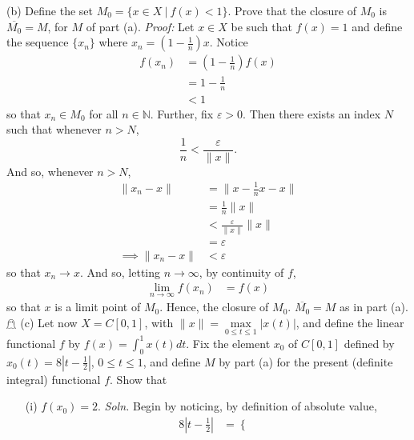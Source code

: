 \documentclass{article}
\begin{document}
\begin{itemize}
    (b) Define the set $M_0 = \{x \in X \: | \: f(x) < 1\}$. Prove that the closure of $M_0$ is $\overline{M_0} = M$, for $M$ of part (a).
    \newline\newline
    \textit{Proof:} Let $x \in X$ be such that $f(x) = 1$ and define the sequence $\{x_n\}$ where $x_n = (1 - \tfrac{1}{n})x$. Notice
    \begin{align*}
        f(x_n) &= (1 - \tfrac{1}{n})f(x)\\
        &= 1 - \tfrac{1}{n}\\
        &< 1
    \end{align*}
    so that $x_n \in M_0$ for all $n \in \mathbb{N}$. Further, fix $\varepsilon > 0$. Then there exists an index $N$ such that whenever $n > N$,
    \[\frac{1}{n} < \frac{\varepsilon}{\|x\|}.\]
    And so, whenever $n > N$,
    \begin{align*}
        \|x_n - x\| &= \|x - \tfrac{1}{n}x - x\|\\
        &= \tfrac{1}{n}\|x\|\\
        &< \frac{\varepsilon}{\|x\|} \|x\|\\
        &= \varepsilon\\
        \implies \|x_n - x\| &< \varepsilon
    \end{align*}
    so that $x_n \to x$. And so, letting $n \to \infty$, by continuity of $f$,
    \begin{align*}
        \lim_{n \to \infty} f(x_n) &= f(x)
    \end{align*}
    so that $x$ is a limit point of $M_0$. Hence, the closure of $M_0$. $\overline{M_0} = M$ as in part (a). \hfill $\mathghost$
    \newline\newline
    (c) Let now $X = C[0,1]$, with $\|x\| = \underset{0 \leq t \leq 1}{\max}|x(t)|$, and define the linear functional $f$ by $f(x) = \int_0^1x(t)dt$. Fix the element $x_0$ of $C[0,1]$ defined by $x_0(t) = 8 | t - \tfrac{1}{2}|$, $0 \leq t \leq 1$, and define $M$ by part (a) for the present (definite integral) functional $f$. Show that
    \begin{itemize}
        \item[(i)] $f(x_0) = 2$. 
        \newline\newline
        \textit{Soln.} Begin by noticing, by definition of absolute value,
        \begin{align*}
            8\left|t - \frac{1}{2}\right| &= \begin{cases}

\end{cases}
\end{align*}
\end{itemize}
\end{itemize}
\end{document}
